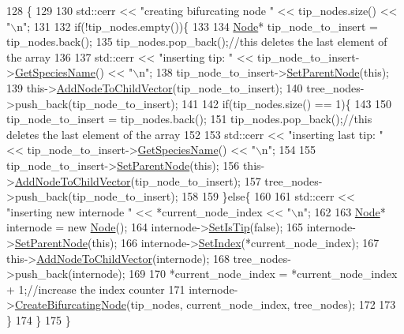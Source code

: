 \begin{DoxyCode}
128                                                                                                            
            \{
129   
130   std::cerr << \textcolor{stringliteral}{"creating bifurcating node "} << tip\_nodes.size() << \textcolor{stringliteral}{"\(\backslash\)n"};
131  
132   \textcolor{keywordflow}{if}(!tip\_nodes.empty())\{
133     
134     \hyperlink{classNode}{Node}* tip\_node\_to\_insert = tip\_nodes.back();
135     tip\_nodes.pop\_back();\textcolor{comment}{//this deletes the last element of the array}
136     
137     std::cerr << \textcolor{stringliteral}{"inserting tip: "} << tip\_node\_to\_insert->\hyperlink{classNode_a9787fabf589f2b0764482b41091f775b}{GetSpeciesName}() << \textcolor{stringliteral}{"\(\backslash\)n"};
138     tip\_node\_to\_insert->\hyperlink{classNode_acb22b8f28ca70e1316a6bafc375ee352}{SetParentNode}(\textcolor{keyword}{this});
139     this->\hyperlink{classNode_aef73af92aa3046218f83ed67a7996188}{AddNodeToChildVector}(tip\_node\_to\_insert);
140     tree\_nodes->push\_back(tip\_node\_to\_insert);
141     
142     \textcolor{keywordflow}{if}(tip\_nodes.size() == 1)\{
143       
150       tip\_node\_to\_insert = tip\_nodes.back();
151       tip\_nodes.pop\_back();\textcolor{comment}{//this deletes the last element of the array}
152       
153       std::cerr << \textcolor{stringliteral}{"inserting last tip: "} << tip\_node\_to\_insert->\hyperlink{classNode_a9787fabf589f2b0764482b41091f775b}{GetSpeciesName}() << \textcolor{stringliteral}{"\(\backslash\)n"};
154       
155       tip\_node\_to\_insert->\hyperlink{classNode_acb22b8f28ca70e1316a6bafc375ee352}{SetParentNode}(\textcolor{keyword}{this});
156       this->\hyperlink{classNode_aef73af92aa3046218f83ed67a7996188}{AddNodeToChildVector}(tip\_node\_to\_insert);
157       tree\_nodes->push\_back(tip\_node\_to\_insert);
158       
159     \}\textcolor{keywordflow}{else}\{
160       
161       std::cerr << \textcolor{stringliteral}{"inserting new internode "} << *current\_node\_index << \textcolor{stringliteral}{"\(\backslash\)n"};
162       
163       \hyperlink{classNode}{Node}* internode = \textcolor{keyword}{new} \hyperlink{classNode_ad7a34779cad45d997bfd6d3d8043c75f}{Node}();
164       internode->\hyperlink{classNode_a89bff92e3930d521439395ccf332418f}{SetIsTip}(\textcolor{keyword}{false});
165       internode->\hyperlink{classNode_acb22b8f28ca70e1316a6bafc375ee352}{SetParentNode}(\textcolor{keyword}{this});
166       internode->\hyperlink{classNode_a6f2acc7b954108a6fe266838fce50ef6}{SetIndex}(*current\_node\_index);
167       this->\hyperlink{classNode_aef73af92aa3046218f83ed67a7996188}{AddNodeToChildVector}(internode);
168       tree\_nodes->push\_back(internode);
169       
170       *current\_node\_index = *current\_node\_index + 1;\textcolor{comment}{//increase the index counter}
171       internode->\hyperlink{classNode_a188e5d00d54887dc3490837f2f025abf}{CreateBifurcatingNode}(tip\_nodes, current\_node\_index, tree\_nodes);
172       
173     \}
174   \}
175 \}
\end{DoxyCode}
\mbox{\label{classNode_a9b9823315fd95dcd24aac97316de2859}} 
